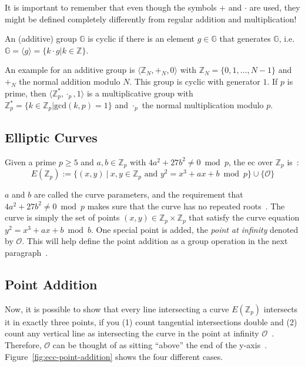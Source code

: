 It is important to remember that even though the symbols $+$ and $\cdot$ are used, they might be defined completely differently from regular addition and multiplication!


\begin{definition}
    An (additive) group $\mathbb{G}$ is cyclic if there is an element $g \in \mathbb{G}$ that generates $\mathbb{G}$, i.e. $\mathbb{G} = \langle g \rangle = \{k \cdot g | k \in \mathbb{Z}\}$.
\end{definition}

An example for an additive group is $\langle \mathbb{Z}_N, +_N, 0 \rangle$ with $\mathbb{Z}_N = \{0, 1, \dots, N-1\}$ and $+_N$ the normal addition modulo $N$.
This group is cyclic with generator $1$.
If $p$ is prime, then $\langle \mathbb{Z}^*_p, \cdot_p, 1 \rangle$ is a multiplicative group with $\mathbb{Z}^*_p = \{k \in \mathbb{Z}_p | \text{gcd}(k,p) = 1\}$ and $\cdot_p$ the normal multiplication modulo $p$.



\subsection{Elliptic Curves}

\begin{definition}
    Given a prime $p \geq 5$ and $a, b \in \mathbb{Z}_p$ with $4a^2 + 27b^2 \neq 0 \bmod{p}$, the \gls{ec} over $\mathbb{Z}_p$ is~\cite{katz_introduction_2015}:
    \begin{equation}
        E(\mathbb{Z}_p) := \{(x, y)~|~x,y \in \mathbb{Z}_p \text{ and } y^2 = x^3 + a x + b \bmod{p}\} \cup \{\mathcal{O}\}
    \end{equation}
\end{definition}

$a$ and $b$ are called the curve parameters, and the requirement that $4a^2 + 27b^2 \neq 0 \bmod{p}$ makes sure that the curve has no repeated roots~\cite{katz_introduction_2015}.
The curve is simply the set of points $(x, y) \in \mathbb{Z}_p \times \mathbb{Z}_p$ that satisfy the curve equation $y^2 = x^3 + a x + b \bmod{b}$.
One special point is added, the \emph{point at infinity} denoted by $\mathcal{O}$.
This will help define the point addition as a group operation in the next paragraph~\cite{katz_introduction_2015}.

\subsection{Point Addition}
Now, it is possible to show that every line intersecting a curve $E(\mathbb{Z}_p)$ intersects it in exactly three points, if you (1) count tangential intersections double and (2) count any vertical line as intersecting the curve in the point at infinity $\mathcal{O}$~\cite{katz_introduction_2015}.
Therefore, $\mathcal{O}$ can be thought of as sitting ``above'' the end of the y-axis~\cite{katz_introduction_2015}.
Figure~\ref{fig:ecc-point-addition} shows the four different cases.

